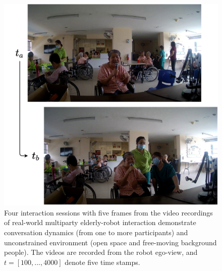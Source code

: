 \documentclass[VANCOUVER,STIX1COL]{WileyNJD-v2}
\begin{document}
\begin{figure}[t]
  \centering
  \includegraphics[width=0.95\linewidth]{assets/interaction_sample.pdf}
  \caption{Four interaction sessions with five frames from the video recordings of real-world multiparty elderly-robot interaction demonstrate conversation dynamics (from one to more participants) and unconstrained environment (open space and free-moving background people). The videos are recorded from the robot ego-view, and $t = [100, ..., 4000]$ denote five time stamps.}
  \label{f:interaction_sample}
\end{figure}
\end{document}
